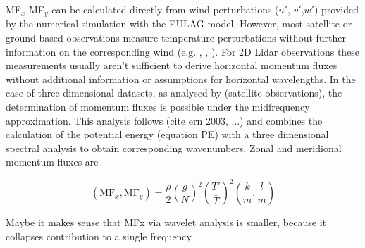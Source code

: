 MF$_x$ MF$_y$ can be calculated directly from wind perturbations ($u'$, $v'$,$w'$) provided by the numerical simulation with the EULAG model. However, most satellite or ground-based observations measure temperature perturbations without further information on the corresponding wind (e.g. \cite{hindley_gravity_2019}, \cite{kaifler_compact_2021}, \cite{wu_satellite_1996}). For 2D Lidar observations these measurements usually aren't sufficient to derive horizontal momentum fluxes without additional information or assumptions for horizontal wavelengths. In the case of three dimensional datasets, as analysed by \textcite{hindley_18year_2020} (satellite observations), the determination of momentum fluxes is possible under the midfrequency approximation. This analysis follows (cite ern 2003, ...) and combines the calculation of the potential energy (equation PE) with a three dimensional spectral analysis to obtain corresponding wavenumbers. Zonal and meridional momentum fluxes are 

\begin{equation}
    (\mathrm{MF}_x, \mathrm{MF}_y) = \frac{\rho}{2} (\frac{g}{N})^2 (\frac{T'}{\bar{T}})^2 (\frac{k}{m},\frac{l}{m})
\end{equation}


Maybe it makes sense that MFx via wavelet analysis is smaller, because it collapses contribution to a single frequency


